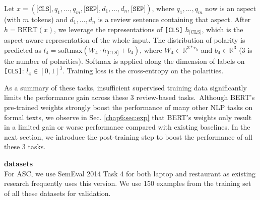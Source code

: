 Let $x=(\texttt{[CLS]}, q_1, \dots, q_m, \texttt{[SEP]}, d_1, \dots, d_n, \texttt{[SEP]})$, where $q_1, \dots, q_m$ now is an aspect (with $m$ tokens) and $d_1, \dots, d_n$ is a review sentence containing that aspect.
After $h=\text{BERT}(x)$, we leverage the representations of \texttt{[CLS]} $h_{\text{[CLS]}}$, which is the aspect-aware representation of the whole input.
The distribution of polarity is predicted as $l_4=\text{softmax}(W_4 \cdot h_{\text{[CLS]}} + b_4)$, where $W_4 \in \mathbb{R}^{3*r_h}$ and $b_4 \in \mathbb{R}^3$ (3 is the number of polarities). Softmax is applied along the dimension of labels on \texttt{[CLS]}: $l_4 \in [0, 1]^{3}$.
Training loss is the cross-entropy on the polarities.

As a summary of these tasks, insufficient supervised training data significantly limits the performance gain across these 3 review-based tasks.~Although BERT's pre-trained weights strongly boost the performance of many other NLP tasks on formal texts, we observe in Sec. \ref{chap6:sec:exp} that BERT's weights only result in a limited gain or worse performance compared with existing baselines.
In the next section, we introduce the post-training step to boost the performance of all these 3 tasks.

\textbf{datasets}\\
For ASC, we use SemEval 2014 Task 4 for both laptop and restaurant as existing research frequently uses this version. We use 150 examples from the training set of all these datasets for validation.

\begin{table}[H]
    \centering
    \caption{ASC in Accuracy and Macro-F1(MF1).}
\label{chap6:tbl:result_asc}
\vspace{-5mm}
\end{table}

